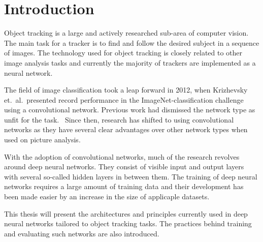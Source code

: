 \section{Introduction}

Object tracking is a large and actively researched sub-area of computer vision. The
main task for a tracker is to find and follow the desired subject in a sequence of
images. The technology used for object tracking is closely related to other image
analysis tasks and currently the majority of trackers are implemented as a neural
network.

The field of image classification took a leap forward in 2012, when
Krizhevsky et.\ al.\ presented record performance in the ImageNet-classification
challenge using a convolutional network. Previous work had dismissed the network
type as unfit for the task.~\cite{NIPS_IMAGENET} Since then, research has shifted
to using convolutional networks as they have several clear advantages over
other network types when used on picture analysis.

With the adoption of convolutional networks, much of the research revolves around
deep neural networks. They consist of visible input and output layers with several
so-called hidden layers in between them. The training of deep neural networks
requires a large amount of training data and their development has been made easier
by an increase in the size of applicaple datasets.

This thesis will present the architectures and principles currently used in deep
neural networks tailored to object tracking tasks. The practices behind training
and evaluating such networks are also introduced.
